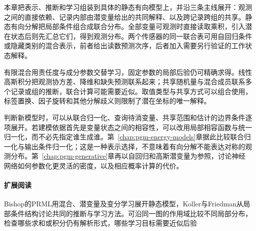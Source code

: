 本章把表示、推断和学习组装到具体的静态有向模型上，并沿三条主线展开：观测之间的直接依赖、记录内部由潜变量给出的共同解释、以及跨记录跨组的共享。静态有向分解把局部条件组合成联合分布。全部变量可观测时直接读取乘积，引入潜在状态后则先汇总它们，得到观测分布。两个传感器的同一联合表可用自回归条件或隐藏类别的混合表示，前者给出读数预测次序，后者加入需要另行验证的工作状态解释。

有限混合用责任度与成分参数交替学习，固定参数的局部后验仍可精确求得。线性高斯积分把观测协方差、降维和缺失预测联系起来；共享随机量与混合成员联系多个记录或组的推断，联合计算可能需要近似。取值类型与共享方式可以组合使用，标签置换、因子旋转和其他分解歧义则限制了潜在坐标的唯一解释。

判断新模型时，可以从联合归一化、查询待消变量、共享范围和估计的边界条件逐项展开。若建模依据首先是变量状态之间的相容性，可以改用局部相容函数与统一归一化，而不必先指定谁生成谁。第~\ref{chap:pgm-energy-models}章据此比较联合归一化与输出条件归一化；这是一种表示选择，不意味着有向分解不能表达对称的观测分布。第~\ref{chap:pgm-generative}章再以自回归和高斯潜变量为参照，讨论神经网络如何参数化更灵活的密度，以及相应概率计算的代价。

\paragraph{扩展阅读}
Bishop的PRML用混合、潜变量及变分学习展开静态模型，Koller与Friedman从局部条件结构讨论共同的推断与学习方法。可沿同一图的作用域比较不同局部分布，检查哪些求和或积分仍有解析形式，哪些学习目标需要近似后验

